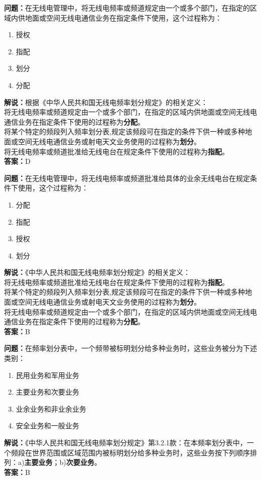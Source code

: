 \documentclass{ctexbook}
\begin{document}
\noindent\textbf{问题：}在无线电管理中，将无线电频率或频道规定由一个或多个部门，在指定的区域内供地面或空间无线电通信业务在指定条件下使用，这个过程称为：
\begin{enumerate}[label=\Alph*), leftmargin=3em]
	\item 授权
	\item 指配
	\item 划分
	\item 分配
\end{enumerate}
\noindent\textbf{解说：}根据《中华人民共和国无线电频率划分规定》的相关定义：\\将无线电频率或频道规定由一个或多个部门，在指定的区域内供地面或空间无线电通信业务在指定条件下使用的过程称为\textbf{分配}。\\将某个特定的频段列入频率划分表,规定该频段可在指定的条件下供一种或多种地面或空间无线电通信业务或射电天文业务使用的过程称为\textbf{划分}。\\将无线电频率或频道批准给无线电台在规定条件下使用的过程称为\textbf{指配}。\\
\textbf{答案：}D



\bigskip


\noindent\textbf{问题：}在无线电管理中，将无线电频率或频道批准给具体的业余无线电台在规定条件下使用，这个过程称为：
\begin{enumerate}[label=\Alph*), leftmargin=3em]
	\item 分配
	\item 指配
	\item 授权
	\item 划分
\end{enumerate}
\noindent\textbf{解说：}《中华人民共和国无线电频率划分规定》的相关定义：\\将无线电频率或频道批准给无线电台在规定条件下使用的过程称为\textbf{指配}。\\将某个特定的频段列入频率划分表,规定该频段可在指定的条件下供一种或多种地面或空间无线电通信业务或射电天文业务使用的过程称为\textbf{划分}。\\将无线电频率或频道规定由一个或多个部门，在指定的区域内供地面或空间无线电通信业务在指定条件下使用的过程称为\textbf{分配}。\\
\textbf{答案：}B



\bigskip


\noindent\textbf{问题：}在频率划分表中，一个频带被标明划分给多种业务时，这些业务被分为下述类别：
\begin{enumerate}[label=\Alph*), leftmargin=3em]
	\item 民用业务和军用业务
	\item 主要业务和次要业务
	\item 业余业务和非业余业务
	\item 安全业务和一般业务
\end{enumerate}
\noindent\textbf{解说：}《中华人民共和国无线电频率划分规定》第3.2.1款：在本频率划分表中，一个频段在世界范围或区域范围内被标明划分给多种业务时，这些业务按下列顺序排列：a)\textbf{主要业务}；b)\textbf{次要业务}。\\\textbf{答案：}B
\end{document}

